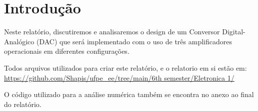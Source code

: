 \section{Introdução}


Neste relatório, discutiremos e analisaremos o design de um Conversor Digital-Analógico (DAC) que será implementado com o uso de três amplificadores operacionais em diferentes configurações.


Todos arquivos utilizados para criar este relatório, e o relatorio em si estão em:  \url{https://github.com/Shapis/ufpe_ee/tree/main/6th semester/Eletronica 1/}


O código utilizado para a análise numérica também se encontra no anexo ao final do relatório.